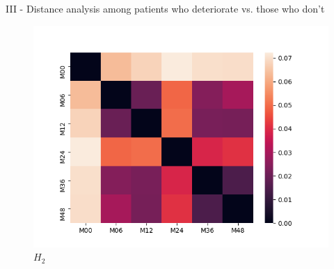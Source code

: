 \documentclass[aspectratio=169, 10pt, dvipsnames]{beamer}
\begin{document}
\begin{frame}[fragile]{III - Distance analysis among patients who deteriorate vs. those who don't}
\begin{figure}
  \end{figure}
  \endminipage
  \hfill
  \begin{figure}
    \centering
    \includegraphics[width=\textwidth]{figures/temporal_evolution/ADNI029S0878_h_2.png}
    \caption{$H_2$}
  \end{figure}
  \endminipage
\end{frame}
\end{document}
